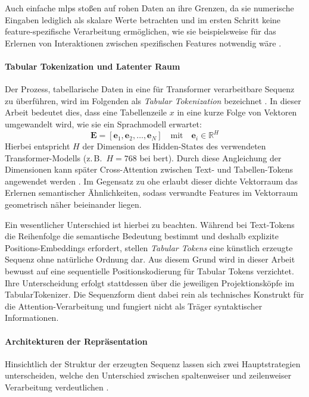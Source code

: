 Auch einfache \Glspl{mlp} stoßen auf rohen Daten an ihre Grenzen, da sie numerische Eingaben lediglich als skalare Werte betrachten und im ersten Schritt keine feature-spezifische Verarbeitung ermöglichen, wie sie beispielsweise für das Erlernen von Interaktionen zwischen spezifischen Features notwendig wäre \cite{Gorishniy2021}.

\paragraph{Tabular Tokenization und Latenter Raum}
Der Prozess, tabellarische Daten in eine für Transformer verarbeitbare Sequenz zu überführen, wird im Folgenden als \textit{Tabular Tokenization} bezeichnet \cite{Borisov2024, Badaro2023}. In dieser Arbeit bedeutet dies, dass eine Tabellenzeile $x$ in eine kurze Folge von Vektoren umgewandelt wird, wie sie ein Sprachmodell erwartet:
\begin{equation}
    \mathbf{E} = [\mathbf{e}_1, \mathbf{e}_2, \dots, \mathbf{e}_N] \quad \text{mit} \quad \mathbf{e}_i \in \mathbb{R}^H
\end{equation}
Hierbei entspricht $H$ der Dimension des Hidden-States des verwendeten Transformer-Modells (z.\,B.\ $H=768$ bei \gls{bert}). Durch diese Angleichung der Dimensionen kann später Cross-Attention zwischen Text- und Tabellen-Tokens angewendet werden \cite{Badaro2023}. Im Gegensatz zu \gls{ohe} erlaubt dieser dichte Vektorraum das Erlernen semantischer Ähnlichkeiten, sodass verwandte Features im Vektorraum geometrisch näher beieinander liegen.

Ein wesentlicher Unterschied ist hierbei zu beachten. Während bei Text-Tokens die Reihenfolge die semantische Bedeutung bestimmt und deshalb explizite Positions-Embeddings erfordert, stellen \textit{Tabular Tokens} eine künstlich erzeugte Sequenz ohne natürliche Ordnung dar. Aus diesem Grund wird in dieser Arbeit bewusst auf eine sequentielle Positionskodierung für Tabular Tokens verzichtet. Ihre Unterscheidung erfolgt stattdessen über die jeweiligen Projektionsköpfe im TabularTokenizer. Die Sequenzform dient dabei rein als technisches Konstrukt für die Attention-Verarbeitung und fungiert nicht als Träger syntaktischer Informationen.


\paragraph{Architekturen der Repräsentation}
Hinsichtlich der Struktur der erzeugten Sequenz lassen sich zwei Hauptstrategien unterscheiden, welche den Unterschied zwischen spaltenweiser und zeilenweiser Verarbeitung verdeutlichen \cite{Badaro2023}.

